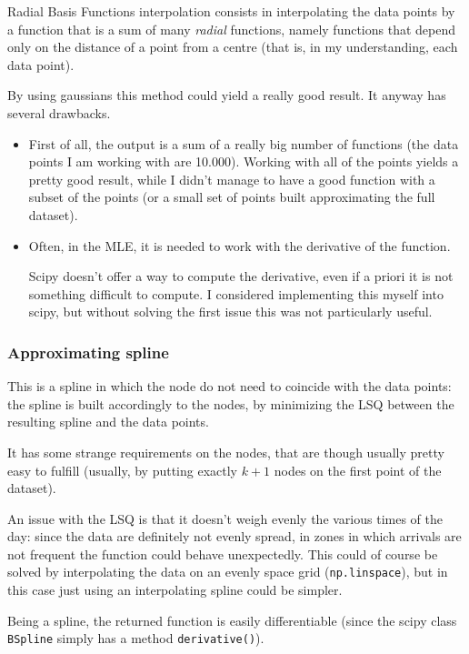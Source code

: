 \documentclass{article}
\begin{document}
Radial Basis Functions interpolation consists in interpolating the data points by a function that is a sum of many \textit{radial} functions,
namely functions that depend only on the distance of a point from a centre (that is, in my understanding, each data point).

By using gaussians this method could yield a really good result.
It anyway has several drawbacks.

\begin{itemize}
\item First of all, the output is a sum of a really big number of functions (the data points I am working with are 10.000).
  Working with all of the points yields a pretty good result,
  while I didn't manage to have a good function with a subset of the points (or a small set of points built approximating the full dataset).
\item Often, in the MLE, it is needed to work with the derivative of the function.

  Scipy doesn't offer a way to compute the derivative, even if a priori it is not something difficult to compute.
  I considered implementing this myself into scipy, but without solving the first issue this was not particularly useful.
\end{itemize}

\subsubsection{Approximating spline}

This is a spline in which the node do not need to coincide with the data points:
the spline is built accordingly to the nodes,
by minimizing the LSQ between the resulting spline and the data points.

It has some strange requirements on the nodes, that are though usually pretty easy to fulfill (usually, by putting exactly \(k+1\) nodes on the first point of the dataset).

An issue with the LSQ is that it doesn't weigh evenly the various times of the day:
since the data are definitely not evenly spread,
in zones in which arrivals are not frequent the function could behave unexpectedly.
This could of course be solved by interpolating the data on an evenly space grid (\verb|np.linspace|),
but in this case just using an interpolating spline could be simpler.

Being a spline, the returned function is easily differentiable (since the scipy class \verb|BSpline| simply has a method \verb|derivative()|).
\end{document}
